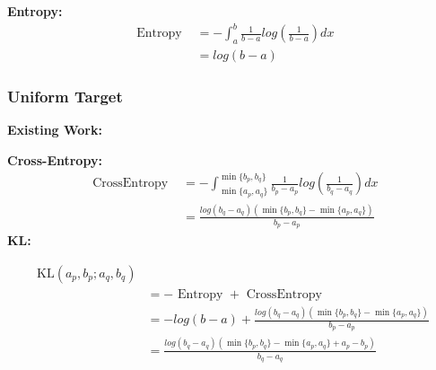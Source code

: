 \documentclass{article}
\begin{document}
\noindent \textbf{Entropy:}
$$ \begin{aligned} \text { Entropy }&=-\int_{a}^{b}\frac{1}{b-a}log(\frac{1}{b-a})dx\\&=log(b-a)
\end{aligned} $$

\subsubsection{Uniform Target}

\noindent \textbf{Existing Work:}

\noindent \textbf{Cross-Entropy:}
$$ \begin{aligned} \text { CrossEntropy }&=-\int_{\min \{a_{p},a_{q}\}}^{\min \{b_{p},b_{q}\}}\frac{1}{b_{p}-a_{p}}log(\frac{1}{b_{q}-a_{q}})dx \\&=\frac{log(b_{q}-a_{q})(\min \{b_{p},b_{q}\}-\min \{a_{p},a_{q}\})}{b_{p}-a_{p}}
\end{aligned} $$
\noindent \textbf{KL:}

$$ \begin{aligned}
\mathrm{KL}\left(a_{p}, b_{p} ; a_{q},b_{q}\right)\\&=-\text { Entropy }+\text { CrossEntropy }\\&=-log(b-a)+\frac{log(b_{q}-a_{q})(\min \{b_{p},b_{q}\}-\min \{a_{p},a_{q}\})}{b_{p}-a_{p}}\\&=\frac{log(b_{q}-a_{q})(\min \{b_{p},b_{q}\}-\min \{a_{p},a_{q}\}+a_{p}-b_{p})}{b_{q}-a_{q}}
\end{aligned} $$
\end{document}
